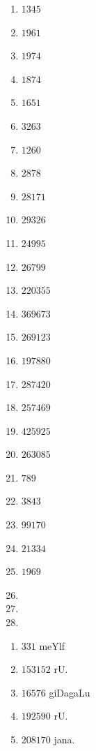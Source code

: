 \begin{multicols}{4}
\begin{enumerate}[$(1)$]
\item $1345$ 
\item $1961$ 
\item $1974$ 
\item $1874$
\item $1651$
\item $3263$
\item $1260$
\item $2878$
\item $28171$ 
\item $29326$
\item $24995$
\item $26799$
\item $220355$ 
\item $369673$
\item $269123$
\item $197880$
\item $287420$
\item $257469$
\item $425925$
\item $263085$
\item $789$
\item $3843$
\item $99170$
\item $21334$
\item $1969$ 
\item[]
\item[]
\item[]
\end{enumerate}
\end{multicols}
\newpage


\begin{multicols}{3}
\begin{enumerate}[$(1)$]
\item $331$ meYlf
\item $153152$ rU.
\item $16576$ giDagaLu
\item $192590$ rU.
\item $208170$ jana.
\end{enumerate}
\end{multicols}


